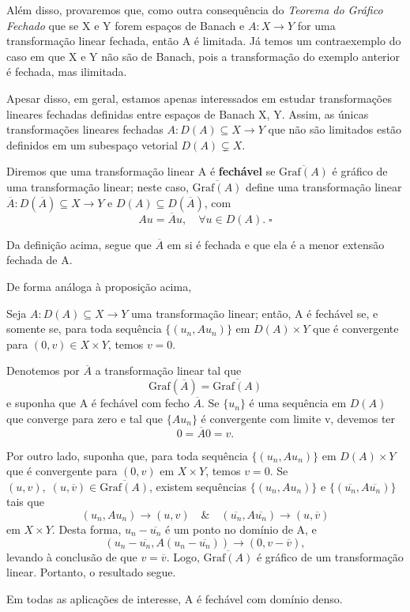 \documentclass[../functional_analysis.tex]{subfiles}
\begin{document}
Além disso, provaremos que, como outra consequência do \textit{Teorema do Gráfico Fechado} que se X e Y forem espaços de Banach e \(A:X\rightarrow Y\) for uma transformação linear fechada, então A é limitada. Já temos um contraexemplo do caso em que X e Y não são de Banach, pois a transformação do exemplo anterior é fechada, mas ilimitada.

Apesar disso, em geral, estamos apenas interessados em estudar transformações lineares fechadas definidas entre espaços de Banach X, Y. Assim, as únicas transformações lineares fechadas \(A:D(A)\subseteq X\rightarrow Y\) que não são limitados estão definidos em um subespaço vetorial \(D(A)\subsetneq X\).

\begin{def*}
	Diremos que uma transformação linear A é \textbf{fechável} se \(\overline{\mathrm{Graf}(A)}\) é gráfico de uma transformação linear; neste caso, \(\overline{\mathrm{Graf}(A)}\) define uma transformação linear \(\overline{A}: D(\overline{A})\subseteq X\rightarrow Y\) e \(D(A)\subseteq D(\overline{A})\), com
	\[
		Au = \overline{A}u,\quad \forall u\in D(A).\; \square
	\]
\end{def*}
Da definição acima, segue que \(\overline{A}\) em si é fechada e que ela é a menor extensão fechada de A.

De forma análoga à proposição acima,
\begin{prop*}
	Seja \(A:D(A)\subseteq X\rightarrow Y\) uma transformação linear; então, A é fechável se, e somente se, para toda sequência \(\{(u_{n}, Au_{n})\}\) em \(D(A)\times Y\) que é convergente para \((0, v)\in X\times Y\), temos \(v=0.\)
\end{prop*}
\begin{proof*}
	Denotemos por \(\overline{A}\) a transformação linear tal que
	\[
		\mathrm{Graf}(\overline{A}) = \overline{\mathrm{Graf}(A)}
	\]
	e suponha que A é fechável com fecho \(\overline{A}\). Se \(\{u_{n}\}\) é uma sequência em \(D(A)\) que converge para zero e tal que \(\{Au_{n}\}\) é convergente com limite v, devemos ter
	\[
		0=\overline{A}0 = v.
	\]

	Por outro lado, suponha que, para toda sequência \(\{(u_{n}, Au_{n})\}\) em \(D(A)\times Y\) que é convergente para \((0, v)\) em \(X\times Y\), temos \(v = 0\). Se \((u, v),\; (u, \overline{v})\in \overline{\mathrm{Graf}(A)}\), existem sequências \(\{(u_{n}, Au_{n})\}\) e \(\{(\overline{u_{n}}, A \overline{u_{n}})\}\) tais que
	\[
		(u_{n}, Au_{n})\rightarrow (u, v) \quad\&\quad (\overline{u_{n}}, A \overline{u_{n}})\rightarrow (u, \overline{v})
	\]
	em \(X\times Y.\) Desta forma, \(u_{n}-\overline{u_{n}}\) é um ponto no domínio de A, e
	\[
		(u_{n}-\overline{u_{n}}, A(u_{n}-\overline{u_{n}}))\rightarrow (0, v-\overline{v}),
	\]
	levando à conclusão de que \(v=\overline{v}.\) Logo, \(\overline{\mathrm{Graf}(A)}\) é gráfico de um transformação linear. Portanto, o resultado segue. \qedsymbol
\end{proof*}
Em todas as aplicações de interesse, A é fechável com domínio denso.
\end{document}
